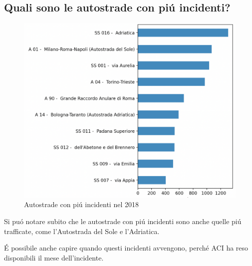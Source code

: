 \documentclass[a4paper]{report}
\begin{document}
\subsection{Quali sono le autostrade con pi\'u incidenti?}
\begin{figure}[!ht]
    \includegraphics[width=\linewidth]{../src/incidenti/incidenti_aci/autostrade.png}
    \caption{Autostrade con pi\'u incidenti nel 2018}
    \label{fig:incidenti_autostrade}
\end{figure}

Si pu\'o notare subito che le autostrade con pi\'u incidenti sono anche quelle pi\'u trafficate, come 
l'Autostrada del Sole e l'Adriatica.




\'E possibile anche capire quando questi incidenti avvengono, perch\'e ACI ha reso disponibili il mese 
dell'incidente.

\newpage
\end{document}
